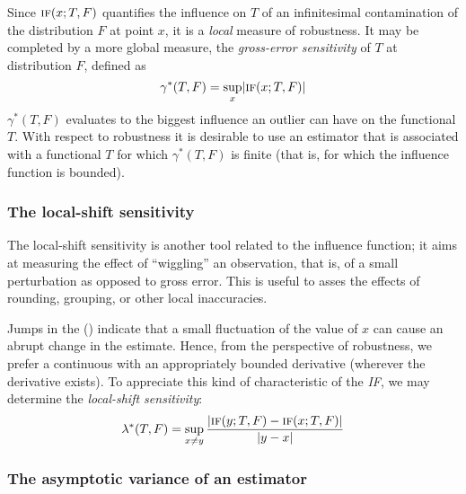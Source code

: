 Since $\stsc{IF}(x; T, F)$ quantifies the influence on $T$ of an infinitesimal
contamination of the distribution $F$ at point $x$, it is a \emph{local}
measure of robustness. It may be completed by a more global measure, the
\emph{gross-error sensitivity} of $T$ at distribution $F$, defined as
\[
    \gamma^*(T, F) = \sup_x \left| \stsc{IF}(x; T, F) \right|
\]
$\gamma^*(T, F)$ evaluates to the biggest influence an outlier can have on
the functional $T$. With respect to robustness it is desirable to use an
estimator that is associated with a functional $T$ for which $\gamma^*(T, F)$ 
is finite (that is, for which the influence function is bounded).


\subsubsection{The local-shift sensitivity}

The local-shift sensitivity is another tool related to the influence function;
it aims at measuring the effect of “wiggling” an observation, that is, of a
small perturbation as opposed to gross error. This is useful to asses the
effects of rounding, grouping, or other local inaccuracies.

Jumps in the  () indicate that a small
fluctuation of the value of $x$ can cause an abrupt change in the estimate.
Hence, from the perspective of robustness, we prefer a continuous 
with an appropriately bounded derivative (wherever the derivative exists). 
To appreciate this kind of characteristic
of the \textit{IF}, we may determine the \emph{local-shift sensitivity}:
\[
    \lambda^*(T, F) = \sup_{x\neq y} \frac{|\stsc{IF}(y; T, F) - \stsc{IF}(x; T, F)|}
                                          {|y - x|}
\]


\subsubsection{The asymptotic variance of an estimator}


